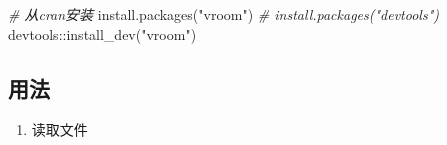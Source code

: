 \documentclass[
]{book}
\newenvironment{Shaded}{\begin{snugshade}}{\end{snugshade}}
\newcommand{\CommentTok}[1]{\textcolor[rgb]{0.56,0.35,0.01}{\textit{#1}}}
\newcommand{\FunctionTok}[1]{\textcolor[rgb]{0.00,0.00,0.00}{#1}}
\newcommand{\NormalTok}[1]{#1}
\newcommand{\SpecialCharTok}[1]{\textcolor[rgb]{0.00,0.00,0.00}{#1}}
\newcommand{\StringTok}[1]{\textcolor[rgb]{0.31,0.60,0.02}{#1}}
\providecommand{\tightlist}{%
  \setlength{\itemsep}{0pt}\setlength{\parskip}{0pt}}
\begin{document}
\begin{Shaded}
\begin{Highlighting}[]
\CommentTok{\# 从cran安装}
\FunctionTok{install.packages}\NormalTok{(}\StringTok{"vroom"}\NormalTok{)}
\CommentTok{\# install.packages("devtools")}
\NormalTok{devtools}\SpecialCharTok{::}\FunctionTok{install\_dev}\NormalTok{(}\StringTok{"vroom"}\NormalTok{)}
\end{Highlighting}
\end{Shaded}

\hypertarget{ux7528ux6cd5}{%
\subsection{用法}\label{ux7528ux6cd5}}

\begin{enumerate}
\def\labelenumi{\arabic{enumi}.}
\tightlist
\item
  读取文件
\end{enumerate}
\end{document}
